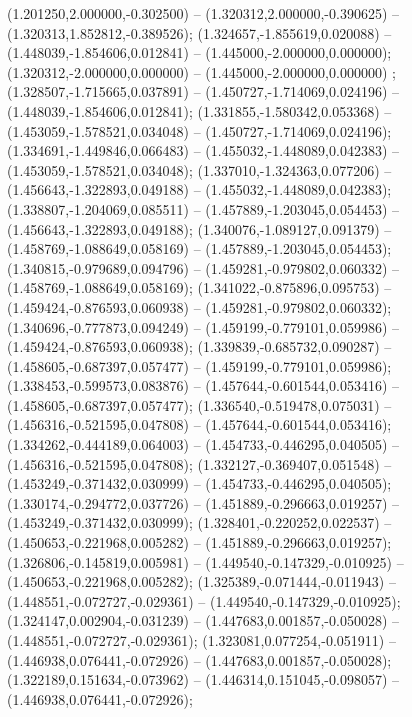  (1.201250,2.000000,-0.302500) -- (1.320312,2.000000,-0.390625) -- (1.320313,1.852812,-0.389526);
 (1.324657,-1.855619,0.020088) -- (1.448039,-1.854606,0.012841) -- (1.445000,-2.000000,0.000000);
 (1.320312,-2.000000,0.000000) -- (1.445000,-2.000000,0.000000) ;
 (1.328507,-1.715665,0.037891) -- (1.450727,-1.714069,0.024196) -- (1.448039,-1.854606,0.012841);
 (1.331855,-1.580342,0.053368) -- (1.453059,-1.578521,0.034048) -- (1.450727,-1.714069,0.024196);
 (1.334691,-1.449846,0.066483) -- (1.455032,-1.448089,0.042383) -- (1.453059,-1.578521,0.034048);
 (1.337010,-1.324363,0.077206) -- (1.456643,-1.322893,0.049188) -- (1.455032,-1.448089,0.042383);
 (1.338807,-1.204069,0.085511) -- (1.457889,-1.203045,0.054453) -- (1.456643,-1.322893,0.049188);
 (1.340076,-1.089127,0.091379) -- (1.458769,-1.088649,0.058169) -- (1.457889,-1.203045,0.054453);
 (1.340815,-0.979689,0.094796) -- (1.459281,-0.979802,0.060332) -- (1.458769,-1.088649,0.058169);
 (1.341022,-0.875896,0.095753) -- (1.459424,-0.876593,0.060938) -- (1.459281,-0.979802,0.060332);
 (1.340696,-0.777873,0.094249) -- (1.459199,-0.779101,0.059986) -- (1.459424,-0.876593,0.060938);
 (1.339839,-0.685732,0.090287) -- (1.458605,-0.687397,0.057477) -- (1.459199,-0.779101,0.059986);
 (1.338453,-0.599573,0.083876) -- (1.457644,-0.601544,0.053416) -- (1.458605,-0.687397,0.057477);
 (1.336540,-0.519478,0.075031) -- (1.456316,-0.521595,0.047808) -- (1.457644,-0.601544,0.053416);
 (1.334262,-0.444189,0.064003) -- (1.454733,-0.446295,0.040505) -- (1.456316,-0.521595,0.047808);
 (1.332127,-0.369407,0.051548) -- (1.453249,-0.371432,0.030999) -- (1.454733,-0.446295,0.040505);
 (1.330174,-0.294772,0.037726) -- (1.451889,-0.296663,0.019257) -- (1.453249,-0.371432,0.030999);
 (1.328401,-0.220252,0.022537) -- (1.450653,-0.221968,0.005282) -- (1.451889,-0.296663,0.019257);
 (1.326806,-0.145819,0.005981) -- (1.449540,-0.147329,-0.010925) -- (1.450653,-0.221968,0.005282);
 (1.325389,-0.071444,-0.011943) -- (1.448551,-0.072727,-0.029361) -- (1.449540,-0.147329,-0.010925);
 (1.324147,0.002904,-0.031239) -- (1.447683,0.001857,-0.050028) -- (1.448551,-0.072727,-0.029361);
 (1.323081,0.077254,-0.051911) -- (1.446938,0.076441,-0.072926) -- (1.447683,0.001857,-0.050028);
 (1.322189,0.151634,-0.073962) -- (1.446314,0.151045,-0.098057) -- (1.446938,0.076441,-0.072926);
